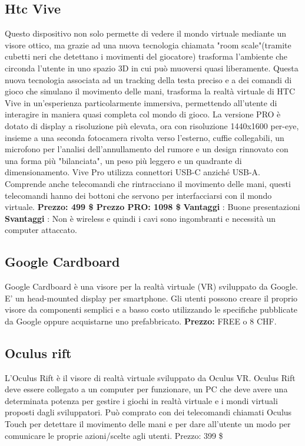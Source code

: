 \documentclass[8pt]{extarticle}
\begin{document}
\begin{multicols}{3}
\subsection{Htc Vive}
Questo dispositivo non solo permette di vedere il mondo virtuale mediante un visore ottico, ma grazie ad una nuova tecnologia chiamata "room scale"(tramite cubetti neri che detettano i movimenti del giocatore) trasforma l'ambiente che circonda l'utente in uno spazio 3D in cui può muoversi quasi liberamente. Questa nuova tecnologia associata ad un tracking della testa preciso e a dei comandi di gioco che simulano il movimento delle mani, trasforma la realtà virtuale di HTC Vive in un'esperienza particolarmente immersiva, permettendo all'utente di interagire in maniera quasi completa col mondo di gioco.
La versione PRO è dotato di display a risoluzione più elevata, ora con risoluzione 1440x1600 per-eye, insieme a una seconda fotocamera rivolta verso l'esterno, cuffie collegabili, un microfono per l'analisi dell'annullamento del rumore e un design rinnovato con una forma più "bilanciata", un peso più leggero e un quadrante di dimensionamento. Vive Pro utilizza connettori USB-C anziché USB-A. Comprende anche telecomandi che rintracciano il movimento delle mani, questi telecomandi hanno dei bottoni che servono per interfacciarsi con il mondo virtuale.
\textbf{Prezzo: 499 \$ Prezzo PRO: 1098 \$}
\textbf{Vantaggi} : Buone presentazioni
\textbf{Svantaggi} : Non è wireless e quindi i cavi sono ingombranti e necessità un computer attaccato.
\subsection{Google Cardboard}
Google Cardboard è una visore per la realtà virtuale (VR) sviluppato da Google. E' un head-mounted display per smartphone.  Gli utenti possono creare il proprio visore da componenti semplici e a basso costo utilizzando le specifiche pubblicate da Google oppure acquistarne uno prefabbricato. 
\textbf{Prezzo:} FREE o 8 CHF.
\subsection{Oculus rift}
L'Oculus Rift è il visore di realtà virtuale sviluppato da Oculus VR. Oculus Rift deve essere collegato a un computer per funzionare, un PC che deve avere una determinata potenza per gestire i giochi in realtà virtuale e i mondi virtuali proposti dagli sviluppatori. 
Può comprato con dei telecomandi chiamati Oculus Touch per detettare il movimento delle mani e per dare all’utente un modo per comunicare le proprie azioni/scelte agli utenti.
Prezzo: 399 \$

\end{multicols}
\end{document}
